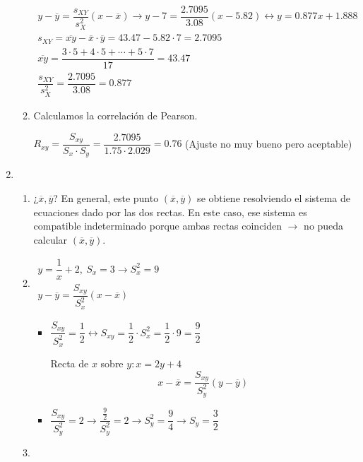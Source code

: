 \begin{enumerate}[label=\color{red}\textbf{\arabic*)}, leftmargin=*]
\begin{enumerate}[label=\color{red}\alph*)]
	$\begin{array}{l}
		y-\overline{y}=\dfrac{s_{XY}}{s_X^2}(x-\overline{x})\longrightarrow y-7=\dfrac{2.7095}{3.08}(x-5.82)\longleftrightarrow y=0.877x+1.888\\
		s_{XY}=\overline{xy}-\overline{x}\cdot\overline{y}=43.47-5.82\cdot7=2.7095\\
		\overline{xy}=\dfrac{3\cdot5+4\cdot5+\cdots+5\cdot7}{17}=43.47\\
		\dfrac{s_{XY}}{s_X^2}=\dfrac{2.7095}{3.08}=0.877
	\end{array}$
	\item {}
	
	Calculamos la correlación de Pearson. 
	
	$R_{xy}=\dfrac{S_{xy}}{S_x\cdot S_y}=\dfrac{2.7095}{1.75\cdot2.029}=0.76$ (Ajuste no muy bueno pero aceptable)
\end{enumerate}
\item {}
\begin{enumerate}[label=\color{red}\alph*)]
	\item {}
	
	¿$\overline{x},\overline{y}$? En general, este punto $(\overline{x},\overline{y})$ se obtiene resolviendo el sistema de ecuaciones dado por las dos rectas. En este caso, ese sistema es compatible indeterminado porque ambas rectas coinciden $\longrightarrow$ no pueda calcular $(\overline{x},\overline{y})$.
	\item {}
	
	$\begin{array}{l}
		y=\dfrac{1}{x}+2,\:S_x=3\longrightarrow S_x^2=9\\
		y-\overline{y}=\dfrac{S_{xy}}{S_x^2}(x-\overline{x})
	\end{array}$
	\begin{itemize}[leftmargin=*]
		\item $\dfrac{S_{xy}}{S_x^2}=\dfrac{1}{2}\longleftrightarrow S_{xy}=\dfrac{1}{2}\cdot S_x^2=\dfrac{1}{2}\cdot9=\dfrac{9}{2}$
		
		Recta de $x$ sobre $y:x=2y+4$\[ x-\overline{x}=\dfrac{S_{xy}}{S_y^2}(y-\overline{y}) \]
		\item $\dfrac{S_{xy}}{S_y^2}=2\longrightarrow\dfrac{\frac{9}{2}}{S_y^2}=2\longrightarrow S_y^2=\dfrac{9}{4}\longrightarrow S_y=\dfrac{3}{2}$
	\end{itemize}
	\item {}
	

\end{enumerate}
\end{enumerate}
